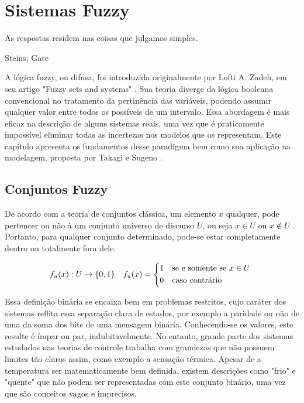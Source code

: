 %

\chapter{Sistemas Fuzzy} \label{capFundFuzzy}
\epigraph{ As respostas residem nas coisas que julgamos simples.}{Steins; Gate}

A lógica fuzzy, ou difusa, foi introduzida originalmente por Lofti A. Zadeh, em seu artigo "Fuzzy sets and systems" \cite{zadeh}. Sua teoria diverge da lógica booleana convencional no tratamento da pertinência das variáveis, podendo assumir qualquer valor entre todos os possíveis de um intervalo. Essa abordagem é mais eficaz na descrição de alguns sistemas reais, uma vez que é praticamente impossível eliminar todas as incertezas nos modelos que os representam. Este capítulo apresenta os fundamentos desse paradigma bem como sua aplicação na modelagem, proposta por Takagi e Sugeno \cite{takagiSugeno}.

\section{Conjuntos Fuzzy}
De acordo com a teoria de conjuntos clássica, um elemento $x$ qualquer, pode pertencer ou não à um conjunto universo de discurso $U$, ou seja $x \in U$ ou $x \notin U$ . Portanto, para qualquer conjunto determinado, pode-se estar completamente dentro ou totalmente fora dele.

\begin{align}
	f_u(x) : U \rightarrow \{0,1\}
	&& f_u(x) =
	\begin{cases*}
		1 & se e somente se $x \in U$ \\
		0 & caso contrário
	\end{cases*}
	\label{eqFPertinencia}
\end{align}

Essa definição binária se encaixa bem em problemas restritos, cujo caráter dos sistemas reflita essa separação clara de estados, por exemplo a paridade ou não de uma da soma dos bits de uma mensagem binária. Conhecendo-se os valores, este resulte é ímpar ou par, indubitavelmente. No entanto, grande parte dos sistemas estudados nas teorias de controle trabalha com grandezas que não possuem limites tão claros assim, como exemplo a sensação térmica. Apesar de a temperatura ser matematicamente bem definida, existem descrições como "frio" e "quente" que não podem ser representadas com este conjunto binário, uma vez que são conceitos vagos e imprecisos.

